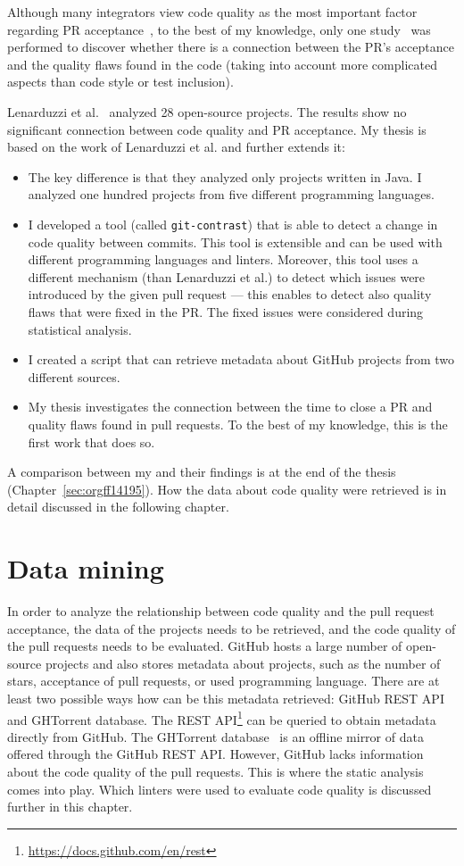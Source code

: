 \documentclass[digital,oneside,oldtable,nolof,nolot,nocover]{fithesis4}
\begin{document}
Although many integrators view code quality as the most important factor
regarding PR acceptance~\cite{integrator}, to the best of my knowledge, only
one study~\cite{quality} was performed to discover whether there is a
connection between the PR's acceptance and the quality flaws found in the
code (taking into account more complicated aspects than code style or test
inclusion).

Lenarduzzi et al.~\cite{quality} analyzed 28 open-source projects. The results show
no significant connection between code quality and PR acceptance.
My thesis is based on the work of Lenarduzzi et al. and further extends it:
\begin{itemize}
\item The key difference is that they analyzed only projects written
in Java. I analyzed one hundred projects from five different programming languages.
\item I developed a tool (called \texttt{git-contrast}) that is able to detect a change in code quality between commits.
This tool is extensible and can be used with different programming languages and linters.
Moreover, this tool uses a different mechanism (than Lenarduzzi et al.) to detect which issues
were introduced by the given pull request --- this enables to detect also quality flaws that were fixed
in the PR. The fixed issues were considered during statistical analysis.
\item I created a script that can retrieve metadata about GitHub projects from two different sources.
\item My thesis investigates the connection between the time to close a PR and quality flaws found
in pull requests. To the best of my knowledge, this is the first work that does so.
\end{itemize}
A comparison between my and their findings is at the end of the thesis (Chapter~\ref{sec:orgff14195}).
How the data about code quality were retrieved is in detail discussed in the following chapter.
\chapter{Data mining}
\label{sec:org4c570b9}
In order to analyze the relationship between code quality and the pull request acceptance,
the data of the projects needs to be retrieved, and the
code quality of the pull requests needs to be evaluated.
GitHub hosts a large number of open-source projects and also stores metadata
about projects, such as the number of stars, acceptance of pull requests, or used programming language.
There are at least two possible ways how can be this metadata retrieved: GitHub REST API
and GHTorrent database. The REST API\footnote{\url{https://docs.github.com/en/rest}} can be queried to
obtain metadata directly from GitHub. The GHTorrent database~\cite{ghtorrent}
is an offline mirror of data offered through the GitHub REST API.
However, GitHub lacks information about the code quality of the pull requests.
This is where the static analysis comes into play. Which linters were used to evaluate code
quality is discussed further in this chapter.
\end{document}
